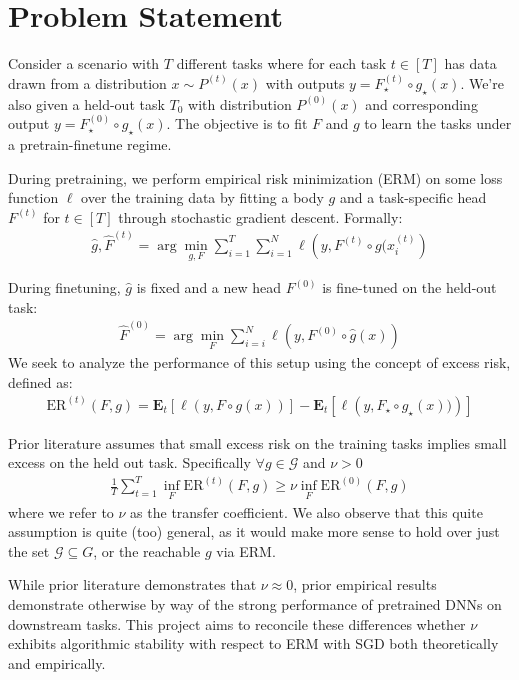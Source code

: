 \documentclass[a4paper, 12pt]{article}
\begin{document}
\section*{Problem Statement}
Consider a scenario with $T$ different tasks where for each task $t \in [T]$ has data drawn from a distribution $x \sim P^{(t)}(x)$ with outputs $y = F_\star^{(t)} \circ g_\star (x)$. We're also given a held-out task $T_0$ with distribution $P^{(0)} (x)$ and corresponding output $y = F_\star^{(0)} \circ g_\star (x)$. The objective is to fit $F$ and $g$ to learn the tasks under a pretrain-finetune regime.

During pretraining, we perform empirical risk minimization (ERM) on some loss function $\ell$ over the training data by fitting a body $g$ and a task-specific head $F^{(t)}$ for $t \in [T]$ through stochastic gradient descent. Formally:
\begin{align}
    \hat{g}, \hat{F}^{(t)} = \arg \min_{g, F} \sum^T_{i = 1} \sum^N_{i = 1} \ell \left(y, F^{(t)} \circ g(x^{(t)}_i \right)
\end{align}

During finetuning, $\hat{g}$ is fixed and a new head $F^{(0)}$ is fine-tuned on the held-out task:
\begin{align}
    \hat{F}^{(0)} = \arg \min_F \sum^N_{i = i} \ell \left(y, F^{(0)} \circ \hat{g}(x) \right)
\end{align}
We seek to analyze the performance of this setup using the concept of excess risk, defined as:
\begin{align}
    \text{ER}^{(t)}(F, g) = \mathbf{E}_t \left[ \ell \left( y, F \circ g(x) \right) \right] - \mathbf{E}_t \left[ \ell \left( y, F_\star \circ g_\star(x)) \right) \right]
\end{align}

Prior literature assumes that small excess risk on the training tasks implies small excess on the held out task. Specifically $\forall g \in \mathcal{G}$ and $\nu > 0$
\begin{align}
    \frac{1}{T} \sum^T_{t = 1} \inf_F \text{ER}^{(t)} (F, g) \geq \nu \inf_F \text{ER}^{(0)} (F, g)
\end{align}
where we refer to $\nu$ as the transfer coefficient. We also observe that this quite assumption is quite (too) general, as it would make more sense to hold over just the set $\mathcal{G} \subseteq G$, or the reachable $g$ via ERM.

While prior literature demonstrates that $\nu \approx 0$, prior empirical results demonstrate otherwise by way of the strong performance of pretrained DNNs on downstream tasks. This project aims to reconcile these differences whether $\nu$ exhibits algorithmic stability with respect to ERM with SGD both theoretically and empirically.
\end{document}
